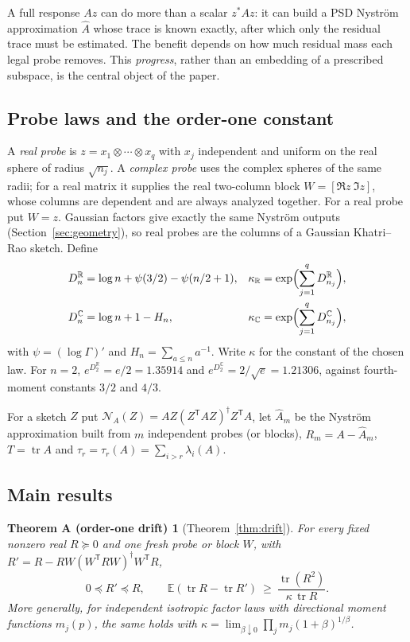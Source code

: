 \documentclass[11pt,a4paper]{article}
\newtheorem*{thmA}{Theorem A (order-one drift)}
\theoremstyle{definition}\newtheorem{definition}[theorem]{Definition}
\theoremstyle{remark}\newtheorem{remark}[theorem]{Remark}
\numberwithin{equation}{section}
\newcommand{\E}{\mathbb E}
\newcommand{\R}{\mathbb R}
\newcommand{\C}{\mathbb C}
\newcommand{\tr}{\operatorname{tr}}
\newcommand{\Nys}{\mathcal N}
\begin{document}
A full response $Az$ can do more than a scalar $z^*Az$: it can build a PSD
Nystr\"om approximation $\widehat A$ whose trace is known exactly, after which
only the residual trace must be estimated. The benefit depends on how much
residual mass each legal probe removes. This \emph{progress}, rather than an
embedding of a prescribed subspace, is the central object of the paper.

\subsection{Probe laws and the order-one constant}
A \emph{real probe} is $z=x_1\otimes\cdots\otimes x_q$ with $x_j$ independent
and uniform on the real sphere of radius $\sqrt{n_j}$. A \emph{complex probe}
uses the complex spheres of the same radii; for a real matrix it supplies the
real two-column block $W=[\Re z\ \Im z]$, whose columns are dependent and are
always analyzed together. For a real probe put $W=z$. Gaussian factors give
exactly the same Nystr\"om outputs (Section~\ref{sec:geometry}), so real
probes are the columns of a Gaussian Khatri--Rao sketch. Define
\begin{align}
 D_n^{\R}&=\log n+\psi(3/2)-\psi(n/2+1),&
 \kappa_{\R}&=\exp\Bigl(\sum_{j=1}^qD_{n_j}^{\R}\Bigr),\label{eq:kreal}\\
 D_n^{\C}&=\log n+1-H_n,&
 \kappa_{\C}&=\exp\Bigl(\sum_{j=1}^qD_{n_j}^{\C}\Bigr),\label{eq:kcomplex}
\end{align}
with $\psi=(\log\Gamma)'$ and $H_n=\sum_{a\le n}a^{-1}$. Write $\kappa$ for the
constant of the chosen law. For $n=2$, $e^{D_2^{\R}}=e/2=1.35914$ and
$e^{D_2^{\C}}=2/\sqrt e=1.21306$, against fourth-moment constants $3/2$ and $4/3$.

For a sketch $Z$ put $\Nys_A(Z)=AZ(Z^{\mathsf T}AZ)^\dagger Z^{\mathsf T}A$, let
$\widehat A_m$ be the Nystr\"om approximation built from $m$ independent probes
(or blocks), $R_m=A-\widehat A_m$, $T=\tr A$ and
$\tau_r=\tau_r(A)=\sum_{i>r}\lambda_i(A)$.

\subsection{Main results}

\begin{thmA}[Theorem~\ref{thm:drift}]
For every fixed nonzero real $R\succeq0$ and one fresh probe or block $W$,
with $R'=R-RW(W^{\mathsf T}RW)^\dagger W^{\mathsf T}R$,
\[
 0\preceq R'\preceq R,\qquad
 \E(\tr R-\tr R')\ \ge\ \frac{\tr(R^2)}{\kappa\,\tr R}.
\]
More generally, for independent isotropic factor laws with directional moment
functions $m_j(p)$, the same holds with
$\kappa=\lim_{\beta\downarrow0}\prod_jm_j(1+\beta)^{1/\beta}$.
\end{thmA}
\end{document}
